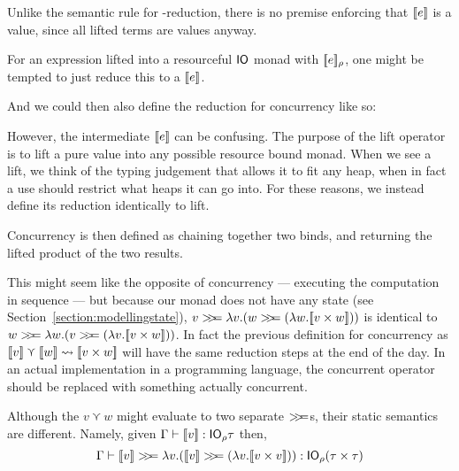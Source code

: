 Unlike the semantic rule for \beta-reduction, there is no premise
enforcing that $\lift{e}$ is a value, since all lifted terms are
values anyway.

For an expression lifted into a resourceful $\IO$ monad with
$\use{\rho}{e}$, one might be tempted to just reduce this to a $\lift{e}$.
\begin{mathpar}
\end{mathpar}

And we could then also define the reduction for concurrency like so:
\begin{mathpar}
\end{mathpar}

However, the intermediate $\lift{e}$ can be confusing. The purpose of
the lift operator is to lift a pure value into any possible resource
bound monad. When we see a lift, we think of the typing judgement that
allows it to fit any heap, when in fact a use should restrict what
heaps it can go into. For these reasons, we instead define its
reduction identically to lift.
\begin{mathpar}
\end{mathpar}

Concurrency is then defined as chaining together two binds, and
returning the lifted product of the two results.
\begin{mathpar}
\end{mathpar}

This might seem like the opposite of concurrency --- executing the
computation in sequence --- but because our monad does not have any
state (see Section~\ref{section:modellingstate}),
${v \bind \lambda v . (w \bind (\lambda w . \lift{v \times w}))}$ is identical to
$w \bind \lambda w . (v \bind (\lambda v . \lift{v \times w}))$. In fact the previous
definition for concurrency as
$\lift{v} \curlyvee \lift{w} \leadsto \llbracket v \times w\rrbracket$ will have the same reduction steps at
the end of the day. In an actual implementation in a programming
language, the concurrent operator should be replaced with something
actually concurrent.

Although the $v \curlyvee w$ might evaluate to two separate $\bind$s, their
static semantics are different. Namely, given
$\Gamma \vdash \lift{v} : \IO_\rho \tau$ then,
\[
\Gamma \vdash \lift{v} \bind \lambda v . (\lift{v} \bind (\lambda v . \lift{v \times v})) : \IO_\rho (\tau \times \tau)
\]

